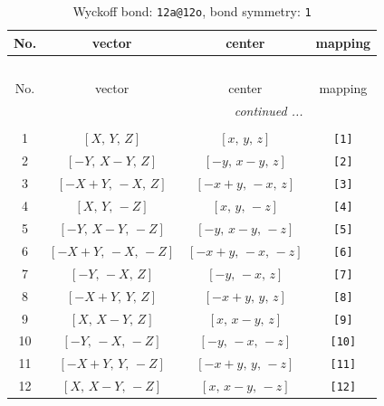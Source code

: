 \documentclass[fleqn,8pt]{jsarticle}
\begin{document}
\begin{longtable}{cccc}
\caption{Wyckoff bond: {\tt 12a@12o}, bond symmetry: {\tt 1}}
 \\
 \hline \hline
No. & vector & center & mapping \\ \hline \endfirsthead

\multicolumn{3}{l}{\tablename\ \thetable{}} \\
 \hline \hline
No. & vector & center & mapping \\ \hline \endhead

 \hline \hline
\multicolumn{3}{r}{\footnotesize\it continued ...} \\ \endfoot

 \hline \hline
\multicolumn{3}{r}{} \\ \endlastfoot

1 & $\left[ X,\, Y,\, Z \right]$ & $\left[ x,\, y,\, z \right]$ & {\tt [1]} \\ \hline
2 & $\left[ - Y,\, X - Y,\, Z \right]$ & $\left[ - y,\, x - y,\, z \right]$ & {\tt [2]} \\ \hline
3 & $\left[ - X + Y,\, - X,\, Z \right]$ & $\left[ - x + y,\, - x,\, z \right]$ & {\tt [3]} \\ \hline
4 & $\left[ X,\, Y,\, - Z \right]$ & $\left[ x,\, y,\, - z \right]$ & {\tt [4]} \\ \hline
5 & $\left[ - Y,\, X - Y,\, - Z \right]$ & $\left[ - y,\, x - y,\, - z \right]$ & {\tt [5]} \\ \hline
6 & $\left[ - X + Y,\, - X,\, - Z \right]$ & $\left[ - x + y,\, - x,\, - z \right]$ & {\tt [6]} \\ \hline
7 & $\left[ - Y,\, - X,\, Z \right]$ & $\left[ - y,\, - x,\, z \right]$ & {\tt [7]} \\ \hline
8 & $\left[ - X + Y,\, Y,\, Z \right]$ & $\left[ - x + y,\, y,\, z \right]$ & {\tt [8]} \\ \hline
9 & $\left[ X,\, X - Y,\, Z \right]$ & $\left[ x,\, x - y,\, z \right]$ & {\tt [9]} \\ \hline
10 & $\left[ - Y,\, - X,\, - Z \right]$ & $\left[ - y,\, - x,\, - z \right]$ & {\tt [10]} \\ \hline
11 & $\left[ - X + Y,\, Y,\, - Z \right]$ & $\left[ - x + y,\, y,\, - z \right]$ & {\tt [11]} \\ \hline
12 & $\left[ X,\, X - Y,\, - Z \right]$ & $\left[ x,\, x - y,\, - z \right]$ & {\tt [12]} \\
\end{longtable}
\end{document}
